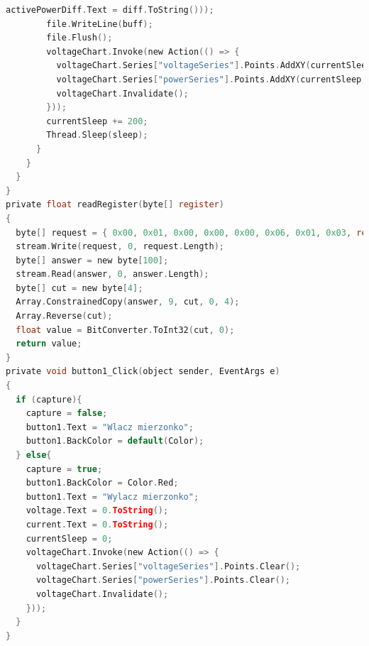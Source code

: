 \documentclass[12pt]{article}
\begin{document}
\begin{lstlisting}[language=c]
        activePowerDiff.Text = diff.ToString()));
        file.WriteLine(buff);
        file.Flush();
        voltageChart.Invoke(new Action(() => {
          voltageChart.Series["voltageSeries"].Points.AddXY(currentSleep, voltageVal);
          voltageChart.Series["powerSeries"].Points.AddXY(currentSleep, powerActiveVal);
          voltageChart.Invalidate();
        }));
        currentSleep += 200;
        Thread.Sleep(sleep);
      }
    }
  }
}
private float readRegister(byte[] register) 
{
  byte[] request = { 0x00, 0x01, 0x00, 0x00, 0x00, 0x06, 0x01, 0x03, register[0], register[1], 0x00, 0x02 };
  stream.Write(request, 0, request.Length);
  byte[] answer = new byte[100];
  stream.Read(answer, 0, answer.Length);
  byte[] cut = new byte[4];
  Array.ConstrainedCopy(answer, 9, cut, 0, 4);
  Array.Reverse(cut);
  float value = BitConverter.ToInt32(cut, 0);
  return value;
}
private void button1_Click(object sender, EventArgs e)
{
  if (capture){
    capture = false;
    button1.Text = "Wlacz mierzonko";
    button1.BackColor = default(Color);
  } else{
    capture = true;
    button1.BackColor = Color.Red;
    button1.Text = "Wylacz mierzonko";
    voltage.Text = 0.ToString();
    current.Text = 0.ToString();
    currentSleep = 0;
    voltageChart.Invoke(new Action(() => {
      voltageChart.Series["voltageSeries"].Points.Clear();
      voltageChart.Series["powerSeries"].Points.Clear();
      voltageChart.Invalidate();
    }));
  }
}
\end{lstlisting}
\end{document}
